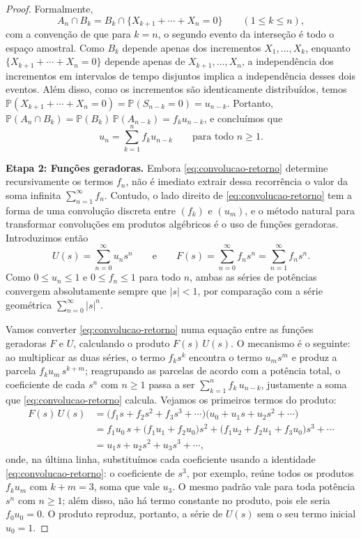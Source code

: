 \documentclass[12pt,portuguese]{article}
\theoremstyle{definition}
\theoremstyle{plainexercise}
\theoremstyle{starredexercise}
\theoremstyle{definition}
\begin{document}
\begin{proof}
Formalmente,
\[
A_n \cap B_k = B_k \cap \{X_{k+1} + \cdots + X_n = 0\}
\qquad (1 \leqslant k \leqslant n),
\]
com a convenção de que para $k = n$, o segundo evento da interseção é todo o espaço amostral.
Como $B_k$ depende apenas dos incrementos $X_1, \ldots, X_k$, enquanto
$\{X_{k+1} + \cdots + X_n = 0\}$ depende apenas de $X_{k+1}, \ldots, X_n$, a
independência dos incrementos em intervalos de tempo disjuntos implica a
independência desses dois eventos. Além disso, como os incrementos são
identicamente distribuídos, temos
$\mathbb{P}(X_{k+1} + \cdots + X_n = 0) = \mathbb{P}(S_{n-k} = 0) = u_{n-k}$.
Portanto, $\mathbb{P}(A_n \cap B_k) = \mathbb{P}(B_k)\,\mathbb{P}(A_{n-k}) = f_k u_{n-k}$,
e concluímos que
\begin{equation}\label{eq:convolucao-retorno}
u_n = \sum_{k=1}^{n} f_k u_{n-k}
\qquad\text{para todo } n \geqslant 1.
\end{equation}

\smallskip
\noindent\textbf{Etapa 2: Funções geradoras.}
Embora \eqref{eq:convolucao-retorno} determine recursivamente os termos $f_n$,
não é imediato extrair dessa recorrência o valor da soma infinita
$\sum_{n=1}^{\infty} f_n$. Contudo, o lado direito de \eqref{eq:convolucao-retorno}
tem a forma de uma convolução discreta entre $(f_k)$ e $(u_m)$, e o método
natural para transformar convoluções em produtos algébricos é o uso de funções
geradoras. Introduzimos então
\[
U(s) = \sum_{n=0}^{\infty} u_n s^n
\qquad\text{e}\qquad
F(s) = \sum_{n=0}^{\infty} f_n s^n = \sum_{n=1}^{\infty} f_n s^n.
\]
Como $0 \leqslant u_n \leqslant 1$ e $0 \leqslant f_n \leqslant 1$ para todo
$n$, ambas as séries de potências convergem absolutamente sempre que $|s| < 1$,
por comparação com a série geométrica $\sum_{n=0}^{\infty} |s|^n$.

Vamos converter \eqref{eq:convolucao-retorno} numa equação entre as funções
geradoras $F$ e $U$, calculando o produto $F(s)\,U(s)$. O mecanismo é o
seguinte: ao multiplicar as duas séries, o termo $f_k s^k$ encontra o termo
$u_m s^m$ e produz a parcela $f_k u_m\,s^{k+m}$; reagrupando as parcelas de
acordo com a potência total, o coeficiente de cada $s^n$ com $n \geqslant 1$
passa a ser $\sum_{k=1}^{n} f_k\,u_{n-k}$, justamente a soma que
\eqref{eq:convolucao-retorno} calcula. Vejamos os primeiros termos do
produto:
\begin{align*}
F(s)\,U(s)
&= \bigl(f_1 s + f_2 s^2 + f_3 s^3 + \cdots\bigr)
   \bigl(u_0 + u_1 s + u_2 s^2 + \cdots\bigr) \\[0.2cm]
&= f_1 u_0\,s
 + \bigl(f_1 u_1 + f_2 u_0\bigr) s^2
 + \bigl(f_1 u_2 + f_2 u_1 + f_3 u_0\bigr) s^3
 + \cdots \\[0.2cm]
&= u_1 s + u_2 s^2 + u_3 s^3 + \cdots,
\end{align*}
onde, na última linha, substituímos cada coeficiente usando a identidade
\eqref{eq:convolucao-retorno}: o coeficiente de $s^3$, por exemplo, reúne
todos os produtos $f_k u_m$ com $k + m = 3$, soma que vale $u_3$. O mesmo
padrão vale para toda potência $s^n$ com $n \geqslant 1$; além disso, não há
termo constante no produto, pois ele seria $f_0 u_0 = 0$. O produto reproduz,
portanto, a série de $U(s)$ sem o seu termo inicial $u_0 = 1$.


\end{proof}
\end{document}
